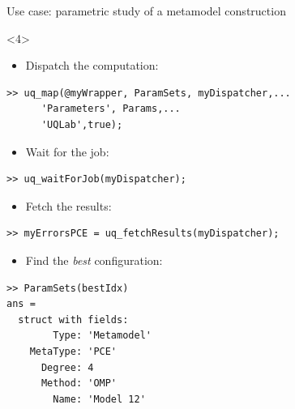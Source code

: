 \documentclass[]{rsuqbeamernew}
\begin{document}
\begin{frame}[fragile]{Use case: parametric study of a metamodel construction}
\begin{onlyenv}<4>
\begin{itemize}
\item Dispatch the computation:
\end{itemize}
\begin{lstlisting}[numbers=none]
>> uq_map(@myWrapper, ParamSets, myDispatcher,...
      'Parameters', Params,...
      'UQLab',true);
\end{lstlisting}
\begin{itemize}
  \item Wait for the job:
\end{itemize}
\begin{lstlisting}[numbers=none]
>> uq_waitForJob(myDispatcher);
\end{lstlisting}
\begin{itemize}
\item Fetch the results:
\end{itemize}
\begin{lstlisting}[numbers=none]
>> myErrorsPCE = uq_fetchResults(myDispatcher);
\end{lstlisting}
\begin{itemize}
  \item Find the \emph{best} configuration:
\end{itemize}
\begin{lstlisting}[numbers=none]
>> ParamSets(bestIdx)
ans = 
  struct with fields:
        Type: 'Metamodel'
    MetaType: 'PCE'
      Degree: 4
      Method: 'OMP'
        Name: 'Model 12'
\end{lstlisting}
\end{onlyenv}

\end{frame}
\end{document}
